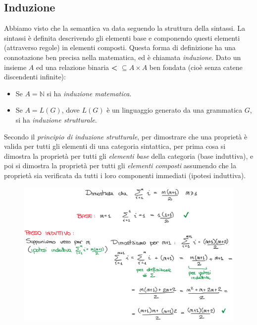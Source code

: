 \documentclass[a4paper,oneside,titlepage]{book}
\begin{document}
\subsection{Induzione}
Abbiamo visto che la semantica va data seguendo la struttura della sintassi. La sintassi è definita descrivendo gli elementi base e componendo questi elementi (attraverso regole) in elementi composti. Questa forma di definizione ha una connotazione ben precisa nella matematica, ed è chiamata \textit{induzione}. Dato un insieme $A$ ed una relazione binaria \textbf{\textless} $\subseteq A \times A$ ben fondata (cioè senza catene discendenti infinite):
\begin{itemize}
	\item Se $A = \mathbb{N}$ si ha \textit{induzione matematica}.
	\item Se $A = L(G)$, dove $L(G)$ è un linguaggio generato da una grammatica $G$, si ha \textit{induzione strutturale}.
\end{itemize}
Secondo il \textit{principio di induzione strutturale}, per dimostrare che una proprietà è valida per tutti gli elementi di una categoria sintattica, per prima cosa si dimostra la proprietà per tutti gli \textit{elementi base} della categoria (base induttiva), e poi si dimostra la proprietà per tutti gli \textit{elementi composti} assumendo che la proprietà sia verificata da tutti i loro componenti immediati (ipotesi induttiva).
\begin{figure}[htp]
	\centering
	\includegraphics[width=\textwidth, height=\textheight, keepaspectratio]{induzione.png}
\end{figure}
\end{document}
